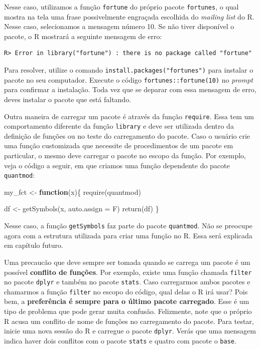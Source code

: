 \documentclass[
  11pt,
]{book}
\newenvironment{Shaded}{\begin{snugshade}}{\end{snugshade}}
\newcommand{\AttributeTok}[1]{\textcolor[rgb]{0.61,0.61,0.61}{#1}}
\newcommand{\ControlFlowTok}[1]{\textcolor[rgb]{0.27,0.27,0.27}{\textbf{#1}}}
\newcommand{\FunctionTok}[1]{\textcolor[rgb]{0,0,0}{#1}}
\newcommand{\NormalTok}[1]{#1}
\newcommand{\OtherTok}[1]{\textcolor[rgb]{0.37,0.37,0.37}{#1}}
\newenvironment{rmdcaution}
{\begin{cautionblock}

} {\end{cautionblock}}
\begin{document}
Nesse caso, utilizamos a função \texttt{fortune} do próprio pacote \texttt{fortunes}, o qual mostra na tela uma frase possivelmente engraçada escolhida do \emph{mailing list} do R. Nesse caso, selecionamos a mensagem número 10. Se não tiver disponível o pacote, o R mostrará a seguinte mensagem de erro:

\begin{verbatim}
R> Error in library("fortune") : there is no package called "fortune"
\end{verbatim}

Para resolver, utilize o comando \texttt{install.packages("fortunes")} para instalar o pacote no seu computador. Execute o código \texttt{fortunes::fortune(10)} no \emph{prompt} para confirmar a instalação. Toda vez que se deparar com essa mensagem de erro, deves instalar o pacote que está faltando.

Outra maneira de carregar um pacote é através da função \texttt{require}. Essa tem um comportamento diferente da função \texttt{library} e deve ser utilizada dentro da definição de funções ou no teste do carregamento do pacote. Caso o usuário crie uma função customizada que necessite de procedimentos de um pacote em particular, o mesmo deve carregar o pacote no escopo da função. Por exemplo, veja o código a seguir, em que criamos uma função dependente do pacote \texttt{quantmod}:

\begin{Shaded}
\begin{Highlighting}[]
\NormalTok{my\_fct }\OtherTok{\textless{}{-}} \ControlFlowTok{function}\NormalTok{(x)\{}
  \FunctionTok{require}\NormalTok{(quantmod)}

\NormalTok{  df }\OtherTok{\textless{}{-}} \FunctionTok{getSymbols}\NormalTok{(x, }\AttributeTok{auto.assign =}\NormalTok{ F)}
  \FunctionTok{return}\NormalTok{(df)}
\NormalTok{\}}
\end{Highlighting}
\end{Shaded}

Nesse caso, a função \texttt{getSymbols} faz parte do pacote \texttt{quantmod}. Não se preocupe agora com a estrutura utilizada para criar uma função no R. Essa será explicada em capítulo futuro.

\begin{rmdcaution}
Uma precaucão que deve sempre ser tomada quando se carrega um pacote é
um possível \textbf{conflito de funções}. Por exemplo, existe uma função
chamada \texttt{filter} no pacote \texttt{dplyr} e também no pacote
\texttt{stats}. Caso carregarmos ambos pacotes e chamarmos a função
\texttt{filter} no escopo do código, qual delas o R irá usar? Pois bem,
a \textbf{preferência é sempre para o último pacote carregado}. Esse é
um tipo de problema que pode gerar muita confusão. Felizmente, note que
o próprio R acusa um conflito de nome de funções no carregamento do
pacote. Para testar, inicie uma nova sessão do R e carregue o pacote
\texttt{dplyr}. Verás que uma mensagem indica haver dois conflitos com o
pacote \texttt{stats} e quatro com pacote o \texttt{base}.
\end{rmdcaution}
\end{document}
